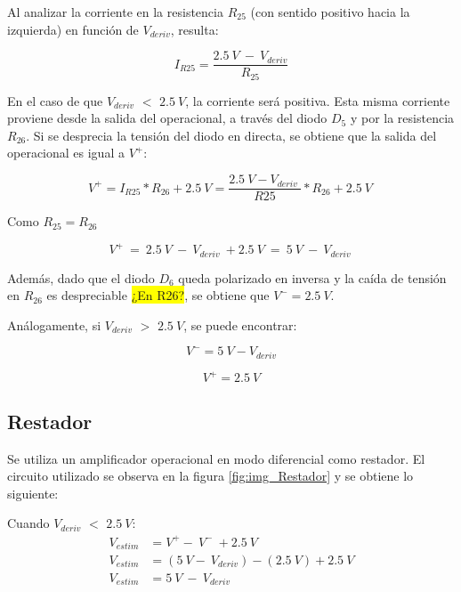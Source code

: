 \noindent Al analizar la corriente en la resistencia $R_{25}$ (con sentido positivo hacia la izquierda) en funci\'{o}n de $V_{deriv}$, resulta:

\begin{equation} \label{eq_corriente_r25}
	I_{R25}=\frac{2.5\:V\ -\ V_{deriv}}{R_{25}}
\end{equation}

\noindent En el caso de que $V_{deriv}$ $\mathrm{<}$ $2.5\:V$, la corriente ser\'{a} positiva. Esta misma corriente proviene desde la salida del operacional, a trav\'{e}s del diodo $D_5$ y por la resistencia $R_{26}$. Si se desprecia la tensi\'{o}n del diodo en directa, se obtiene que la salida del operacional es igual a $V^+$:

\begin{equation} \label{eq_V+}
	V^+=I_{R25}*R_{26}+2.5\:V=\frac{2.5\:V-V_{deriv}\ }{R25}*R_{26}+2.5\:V\ 
\end{equation} 

Como $R_{25}=R_{26}$

\begin{equation} \label{eq_V+_2}
	V^+\ =\ 2.5\:V\ -\ V_{deriv}\ +2.5\:V\ =\ 5\:V\ -\ V_{deriv}\ 
\end{equation}

Además, dado que el diodo $D_6$ queda polarizado en inversa y la caída de tensión en $R_{26}$ es despreciable \colorbox{yellow}{¿En R26?}, se obtiene que $V^- = 2.5\:V$.

An\'{a}logamente, si $V_{deriv}$ $\mathrm{>}$ $2.5\:V$, se puede encontrar:

\begin{equation} \label{eq_V+_3}
	V^- =5\:V-V_{deriv} 
\end{equation}

\begin{equation} 
	V^+ = 2.5\:V
\end{equation}


\subsection{Restador}

\noindent Se utiliza un amplificador operacional en modo diferencial como restador. El circuito utilizado se observa en la figura \ref{fig:img_Restador} y se obtiene lo siguiente:

\noindent Cuando $V_{deriv}$ $\mathrm{<}$ $2.5\:V$:
\begin{equation*} 
	\begin{aligned}
		V_{estim}&=V^+-\ V^-\ +2.5\:V\\ 
		V_{estim}&=(5\:V -\ V_{deriv})-(2.5\: V)+2.5\:V\\
		V_{estim}&=5\: V\ -\ V_{deriv}\\ 
	\end{aligned}
\end{equation*}


